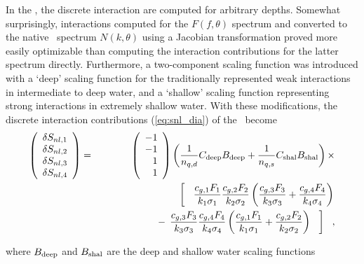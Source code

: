 In the \gmd, the discrete interaction are computed for arbitrary depths.
Somewhat surprisingly, interactions computed for the $F(f, \theta)$ spectrum
and converted to the native \ws\ spectrum $N(k, \theta)$ using a Jacobian
transformation proved more easily optimizable than computing the interaction
contributions for the latter spectrum directly. Furthermore, a two-component
scaling function was introduced with a `deep' scaling function for the
traditionally represented weak interactions in intermediate to deep water, and
a `shallow' scaling function representing strong interactions in extremely
shallow water. With these modifications, the discrete interaction
contributions (\ref{eq:snl_dia}) of the \dia\ become
\begin{eqnarray}
\left ( \begin{array}{c}
  \delta S_{nl,1} \\ \delta S_{nl,2} \\ \delta S_{nl,3} \\ \delta S_{nl,4} 
\end{array} \right )  & = &  
\left ( \begin{array}{r} -1 \\  -1 \\ 1 \\ 1 \end{array} \right )
  \left ( \frac{1}{n_{q,d}} C_{\rm{deep}} B_{\rm{deep}} + 
          \frac{1}{n_{q,s}} C_{\rm{shal}} B_{\rm{shal}} \right ) \times \nonumber \\
 &  & \hspace{20mm} \left [ \:\:\:\:
                    \frac{c_{g,1}F_1}{k_1 \sigma_1} 
                    \frac{c_{g,2}F_2}{k_2 \sigma_2} \left ( 
                    \frac{c_{g,3}F_3}{k_3 \sigma_3} +
                    \frac{c_{g,4}F_4}{k_4 \sigma_4} \right )
                                                         \right . \nonumber \\
 &  &  \hspace{20mm} \left . - \:\:
                    \frac{c_{g,3}F_3}{k_3 \sigma_3} 
                    \frac{c_{g,4}F_4}{k_4 \sigma_4} \left ( 
                    \frac{c_{g,1}F_1}{k_1 \sigma_1} + 
                    \frac{c_{g,2}F_2}{k_2 \sigma_2} \right ) \:\:\:\:
                                                    \right ] \:\:\:
, \label{eq:gmd_dsnl} 
\end{eqnarray}

\noindent
where $B_{\rm{deep}}$ and $B_{\rm{shal}}$ are the deep and shallow water
scaling functions

